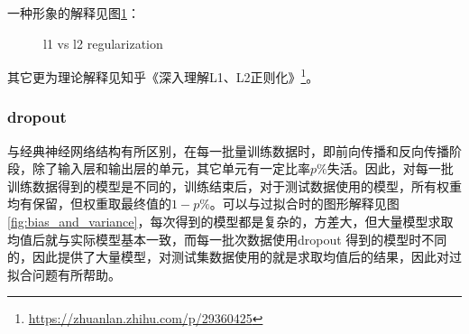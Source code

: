 一种形象的解释见图\ref{fig:regularization}：
\begin{figure}[htb]
	\centering
	
	{\quad
	}
	\caption{l1 vs l2 regularization}
	\label{fig:regularization}
\end{figure}
其它更为理论解释见知乎《深入理解L1、L2正则化》\footnote{\url{https://zhuanlan.zhihu.com/p/29360425}}。
\subsubsection{dropout}
与经典神经网络结构有所区别，在每一批量训练数据时，即前向传播和反向传播阶段，除了输入层和输出层的单元，其它单元有一定比率$p\%$失活。因此，对每一批训练数据得到的模型是不同的，训练结束后，对于测试数据使用的模型，所有权重均有保留，但权重取最终值的$1-p\%$。可以与过拟合时的图形解释见图\ref{fig:bias_and_variance}，每次得到的模型都是复杂的，方差大，但大量模型求取均值后就与实际模型基本一致，而每一批次数据使用dropout 得到的模型时不同的，因此提供了大量模型，对测试集数据使用的就是求取均值后的结果，因此对过拟合问题有所帮助。